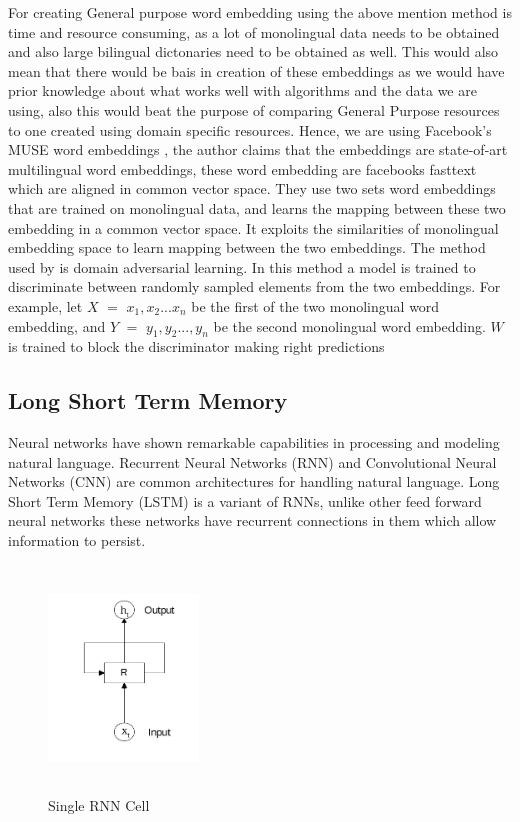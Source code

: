 For creating General purpose word embedding using the above mention method is time and resource consuming, as a lot of monolingual data needs to be obtained and also large bilingual dictonaries need to be obtained as well. This would also mean that there would be bais in creation of these embeddings as we would have prior knowledge about what works well with algorithms and the data we are using, also this would beat the purpose of comparing General Purpose resources to one created using domain specific resources. Hence, we are using Facebook's MUSE word embeddings \cite{conneau2017word}, the author claims that the embeddings are state-of-art multilingual word embeddings, these word embedding are facebooks fasttext \cite{bojanowski2017enriching} which are aligned in common vector space. They use two sets word embeddings that are trained on monolingual data, and learns the mapping between these two embedding in a common vector space. It exploits the similarities of monolingual embedding space \cite{mikolov2013exploiting} to learn mapping between the two embeddings.
The method used by \cite{conneau2017word} is domain adversarial learning. In this method a model is trained to discriminate between randomly sampled elements from the two embeddings. For example, let $X$ $=$ ${x_{1}, x_{2}...x_{n}}$ be the first of the two monolingual word embedding, and $Y$ $=$ ${y_{1}, y_{2}...,y_{n}}$ be the second monolingual word embedding. $W$ is trained to block the discriminator making right predictions



\subsection{Long Short Term Memory}
Neural networks have shown remarkable capabilities in processing and modeling natural language. Recurrent Neural Networks (RNN) and Convolutional Neural Networks (CNN) are common architectures for handling natural language. Long Short Term Memory (LSTM)\cite{hochreiter1997long} is a variant of RNNs, unlike other feed forward neural networks these networks have recurrent connections in them which allow information to persist.

\begin{figure}[!ht]
    \centering
    \includegraphics[width=4cm,height=6cm,keepaspectratio]{pics/rnn_cell.jpg}
    \captionsetup{justification=centering,margin=2cm}
    \caption{Single RNN Cell}
    \label{fig:rnn_single_cell}
\end{figure}


